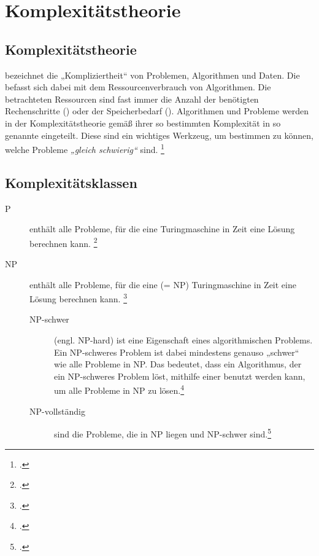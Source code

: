 \documentclass{lehramt-informatik-haupt}
\begin{document}


\chapter{Komplexitätstheorie}

%

\section{Komplexitätstheorie}

 bezeichnet die „Kompliziertheit“ von Problemen,
Algorithmen und Daten.
%
Die  befasst sich dabei mit dem
Ressourcenverbrauch von Algorithmen.
%
Die betrachteten Ressourcen sind fast immer die Anzahl der
benötigten Rechenschritte () oder der
Speicherbedarf ().
%
Algorithmen und Probleme werden in der Komplexitätstheorie gemäß ihrer
so bestimmten Komplexität in so genannte 
eingeteilt. Diese sind ein wichtiges Werkzeug, um bestimmen zu können,
welche Probleme \emph{„gleich schwierig“} sind.
\footcite[Seite 58]{theo:fs:4}

\section{Komplexitätsklassen}

\begin{description}
\item[P]
enthält alle Probleme, für die eine 
Turingmaschine in  Zeit eine Lösung berechnen kann.
\footcite[Seite 59]{theo:fs:4}

\item[NP]
enthält alle Probleme, für die eine  (=
NP) Turingmaschine in  Zeit eine Lösung berechnen
kann.
\footcite[Seite 60]{theo:fs:4}

\begin{description}
\item[NP-schwer] (engl. NP-hard) ist eine Eigenschaft eines
algorithmischen Problems. Ein NP-schweres Problem ist dabei mindestens
genauso „schwer“ wie alle Probleme in NP. Das bedeutet, dass ein
Algorithmus, der ein NP-schweres Problem löst, mithilfe einer
 benutzt werden kann, um alle Probleme in NP zu
lösen.\footcite{wiki:np-schwer}

\item[NP-vollständig] sind die Probleme, die in NP liegen
und NP-schwer sind.\footcite{wiki:np-vollstaendig}
\end{description}
\end{description}
\end{document}

